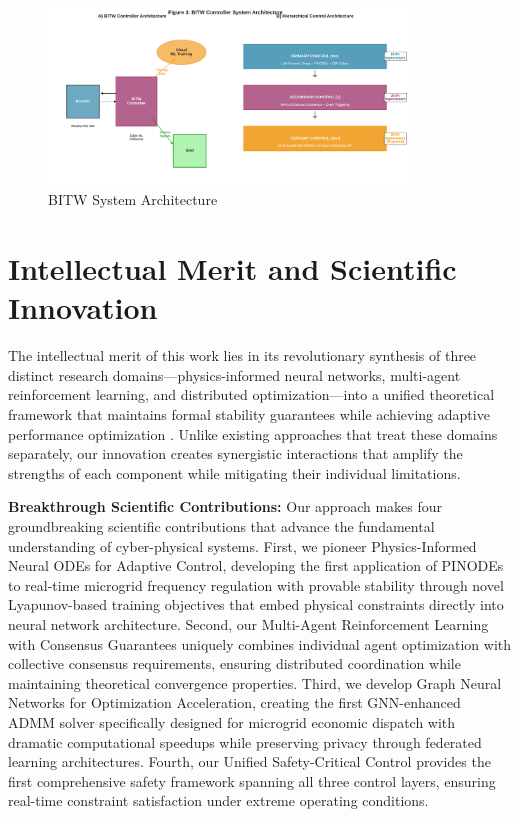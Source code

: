 \documentclass[12pt]{article}
\begin{document}
\begin{figure}[H]
\centering
\includegraphics[width=0.85\textwidth]{figure3_system_architecture.pdf}
\caption{BITW System Architecture}
\end{figure}

\section{Intellectual Merit and Scientific Innovation}

The intellectual merit of this work lies in its revolutionary synthesis of three distinct research domains---physics-informed neural networks, multi-agent reinforcement learning, and distributed optimization---into a unified theoretical framework that maintains formal stability guarantees while achieving adaptive performance optimization \cite{bevrani2021,palizban2014}. Unlike existing approaches that treat these domains separately, our innovation creates synergistic interactions that amplify the strengths of each component while mitigating their individual limitations.

\textbf{Breakthrough Scientific Contributions:} Our approach makes four groundbreaking scientific contributions that advance the fundamental understanding of cyber-physical systems. First, we pioneer Physics-Informed Neural ODEs for Adaptive Control, developing the first application of PINODEs to real-time microgrid frequency regulation with provable stability through novel Lyapunov-based training objectives that embed physical constraints directly into neural network architecture. Second, our Multi-Agent Reinforcement Learning with Consensus Guarantees uniquely combines individual agent optimization with collective consensus requirements, ensuring distributed coordination while maintaining theoretical convergence properties. Third, we develop Graph Neural Networks for Optimization Acceleration, creating the first GNN-enhanced ADMM solver specifically designed for microgrid economic dispatch with dramatic computational speedups while preserving privacy through federated learning architectures. Fourth, our Unified Safety-Critical Control provides the first comprehensive safety framework spanning all three control layers, ensuring real-time constraint satisfaction under extreme operating conditions.
\end{document}
